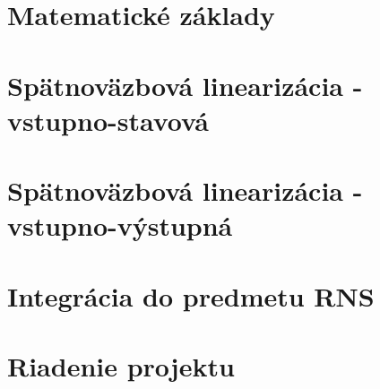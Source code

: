 \newpage
{}
{
	\section{Matematické základy}\label{sec:matematicke_zaklady}
	

    \newpage
    \clearpage 
	\section{Spätnoväzbová linearizácia - vstupno-stavová}\label{sec:vsl}
 	
 	

    \newpage
    \clearpage 
	\section{Spätnoväzbová linearizácia - vstupno-výstupná}\label{sec:vvl}
 	
 	

    \newpage
    \clearpage 
    \section{Integrácia do predmetu RNS}\label{sec:integracia}
 	

    \newpage
    \clearpage 
    \section{Riadenie projektu}\label{sec:riadproj}
 	
}
{
}


